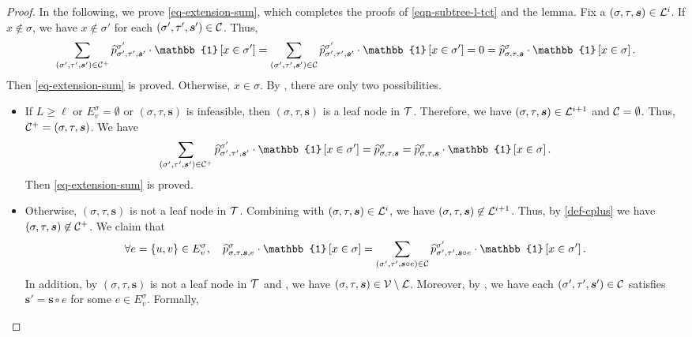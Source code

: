 \documentclass[11pt]{article}
\newcommand{\set}[1]{\left\{#1\right\}}
\newcommand{\id}[1]{\mathbb{1}\left[#1\right]}
\newcommand{\seqS}{\boldsymbol{s}}
\begin{document}
\begin{proof}
    In the following, we prove \eqref{eq-extension-sum}, which completes the proofs of \eqref{eqn-subtree-l-tct} and the lemma. Fix a $(\sigma,\tau,\seqS)\in \+L^i$.  
    If $x\not \in \sigma$, we have $x\not\in \sigma'$ for each $(\sigma',\tau',\seqS')\in \+C$.
    Thus, 
    \begin{align*}
    \sum_{(\sigma',\tau', \seqS')\in \+C^{+} } \widehat{p}^{\sigma'}_{\sigma',\tau',\seqS'}\cdot \id{x\in \sigma'}=\sum_{(\sigma',\tau', \seqS')\in \+C} \widehat{p}^{\sigma'}_{\sigma',\tau',\seqS'}\cdot\id{ x\in \sigma'} =0 = \widehat{p}^{\sigma}_{\sigma,\tau,\seqS}\cdot \id{x \in \sigma}.
    \end{align*}
    Then \eqref{eq-extension-sum} is proved.
    Otherwise, $x \in \sigma$.     
    By ,
    there are only two possibilities.
    \begin{itemize}
    \item If $L\geq \ell$ or $E_v^{\sigma}=\emptyset$ or $(\sigma, \tau, \seqS)$ is infeasible, then $(\sigma,\tau,\seqS)$ is a leaf node in $\mathcal{T}$.
    Therefore, we have $(\sigma,\tau,\seqS)\in \+L^{i+1}$ and $\mathcal{C} = \emptyset$.
    Thus, $\+C^+ = (\sigma, \tau, \seqS)$.
    We have 
    \begin{align*}
    \sum_{(\sigma',\tau', \seqS')\in \+C^{+}} \widehat{p}^{\sigma'}_{\sigma',\tau',\seqS'}\cdot \id{x\in \sigma'} = \widehat{p}^{\sigma}_{\sigma,\tau,\seqS} = \widehat{p}^{\sigma}_{\sigma,\tau,\seqS}\cdot \id{x \in \sigma}.
    \end{align*}
    Then \eqref{eq-extension-sum} is proved.    
    \item Otherwise, $(\sigma,\tau,\seqS)$ is not a leaf node in $\mathcal{T}$. Combining with $(\sigma,\tau,\seqS) \in \+L^{i}$, we have 
    $(\sigma,\tau,\seqS) \not\in \+L^{i+1}$.
    Thus, by \eqref{def-cplus} we have $(\sigma,\tau,\seqS) \not\in \+C^{+}$.
    We claim that 
    \begin{align}\label{eq-extension-sum-edge}
     \forall e = \set{u,v} \in E_v^{\sigma}, \quad \widehat{p}^{\sigma}_{\sigma,\tau,\seqS,e}\cdot \id{x \in \sigma} = \sum_{(\sigma',\tau', \seqS\circ e)\in \+C } \widehat{p}^{\sigma'}_{\sigma',\tau',\seqS\circ e}\cdot \id{x\in \sigma'}.
    \end{align}
    In addition, by $(\sigma,\tau,\seqS)$ is not a leaf node in $\mathcal{T}$ and , we have 
    $(\sigma,\tau,\seqS)\in \+V\setminus \+L$.
    Moreover, by , we have each $(\sigma',\tau', \seqS')\in \+C$ satisfies $\seqS' = \seqS \circ e$ for some $e \in E_v^{\sigma}$. Formally,

\end{itemize}
\end{proof}
\end{document}
